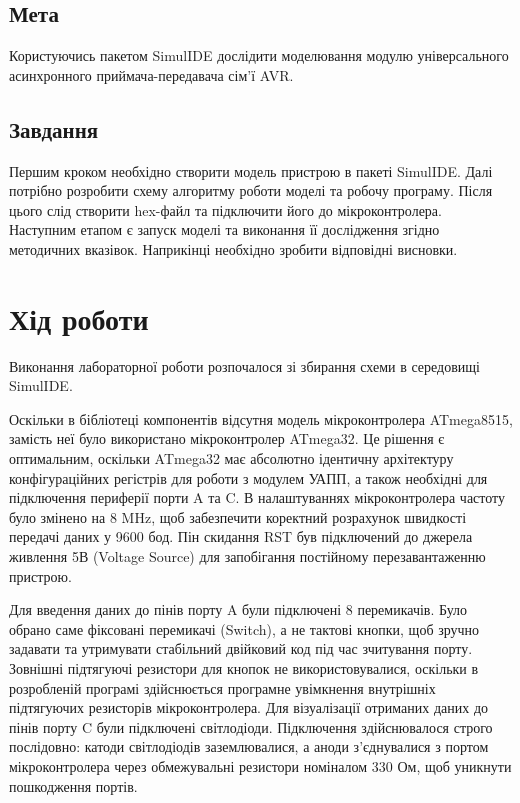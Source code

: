 \documentclass[14pt, a4paper]{extreport}
\begin{document}
	\subsection*{Мета} 
	Користуючись пакетом SimulIDE дослідити моделювання модулю універсального асинхронного приймача-передавача сім’ї AVR.
	
	\subsection*{Завдання}
	Першим кроком необхідно створити модель пристрою в пакеті SimulIDE. Далі потрібно розробити схему алгоритму роботи моделі та робочу програму. Після цього слід створити hex-файл та підключити його до мікроконтролера. Наступним етапом є запуск моделі та виконання її дослідження згідно методичних вказівок. Наприкінці необхідно зробити відповідні висновки.
	
	\section*{Хід роботи}
	
	Виконання лабораторної роботи розпочалося зі збирання схеми в середовищі SimulIDE.
	
	
	Оскільки в бібліотеці компонентів відсутня модель мікроконтролера ATmega8515, замість неї було використано мікроконтролер ATmega32. Це рішення є оптимальним, оскільки ATmega32 має абсолютно ідентичну архітектуру конфігураційних регістрів для роботи з модулем УАПП, а також необхідні для підключення периферії порти A та C. В налаштуваннях мікроконтролера частоту було змінено на 8 MHz, щоб забезпечити коректний розрахунок швидкості передачі даних у 9600 бод. Пін скидання RST був підключений до джерела живлення 5В (Voltage Source) для запобігання постійному перезавантаженню пристрою.
	
	Для введення даних до пінів порту A були підключені 8 перемикачів. Було обрано саме фіксовані перемикачі (Switch), а не тактові кнопки, щоб зручно задавати та утримувати стабільний двійковий код під час зчитування порту. Зовнішні підтягуючі резистори для кнопок не використовувалися, оскільки в розробленій програмі здійснюється програмне увімкнення внутрішніх підтягуючих резисторів мікроконтролера. Для візуалізації отриманих даних до пінів порту C були підключені світлодіоди. Підключення здійснювалося строго послідовно: катоди світлодіодів заземлювалися, а аноди з'єднувалися з портом мікроконтролера через обмежувальні резистори номіналом 330 Ом, щоб уникнути пошкодження портів.
	
\end{document}
